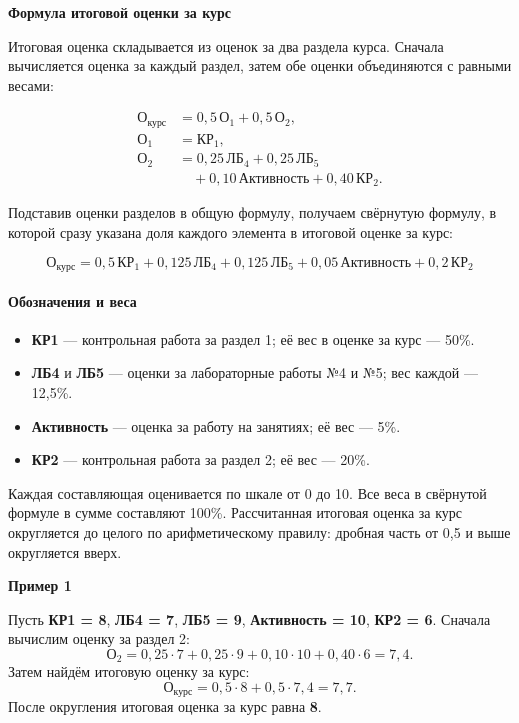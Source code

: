 \documentclass[a4paper,12pt]{extarticle}
\begin{document}
\thispagestyle{empty}
\begin{center}
{\Large\textbf{Формула итоговой оценки за курс}}
\end{center}

Итоговая оценка складывается из оценок за два раздела курса. Сначала
вычисляется оценка за каждый раздел, затем обе оценки объединяются с равными
весами:

\[
\begin{aligned}
    \text{О}_{\text{курс}} &= 0{,}5\,\text{О}_1 + 0{,}5\,\text{О}_2,\\
    \text{О}_1 &= \text{КР}_1,\\[1em]
    \text{О}_2 &= 0{,}25\,\text{ЛБ}_4 + 0{,}25\,\text{ЛБ}_5\\
        &\quad + 0{,}10\,\text{Активность} + 0{,}40\,\text{КР}_2.
\end{aligned}
\]

Подставив оценки разделов в общую формулу, получаем свёрнутую формулу, в которой
сразу указана доля каждого элемента в итоговой оценке за курс:

\[
\boxed{\text{О}_{\text{курс}} = 0{,}5\,\text{КР}_1
    + 0{,}125\,\text{ЛБ}_4 + 0{,}125\,\text{ЛБ}_5
    + 0{,}05\,\text{Активность} + 0{,}2\,\text{КР}_2}
\]

\paragraph{Обозначения и веса}
\begin{itemize}
    \item \textbf{КР1} --- контрольная работа за раздел 1; её вес в оценке за курс --- 50\%.
    \item \textbf{ЛБ4} и \textbf{ЛБ5} --- оценки за лабораторные работы №4 и №5; вес каждой --- 12{,}5\%.
    \item \textbf{Активность} --- оценка за работу на занятиях; её вес --- 5\%.
    \item \textbf{КР2} --- контрольная работа за раздел 2; её вес --- 20\%.
\end{itemize}

Каждая составляющая оценивается по шкале от 0 до 10. Все веса в свёрнутой
формуле в сумме составляют 100\%. Рассчитанная итоговая оценка за курс
округляется до целого по арифметическому правилу: дробная часть от 0{,}5 и выше
округляется вверх.

\medskip
\noindent\textbf{Пример 1}\par
Пусть \textbf{КР1 = 8}, \textbf{ЛБ4 = 7}, \textbf{ЛБ5 = 9},
\textbf{Активность = 10}, \textbf{КР2 = 6}. Сначала вычислим оценку за раздел 2:
\[
\text{О}_2 = 0{,}25\cdot 7 + 0{,}25\cdot 9 + 0{,}10\cdot 10
    + 0{,}40\cdot 6 = 7{,}4.
\]
Затем найдём итоговую оценку за курс:
\[
\text{О}_{\text{курс}} = 0{,}5\cdot 8 + 0{,}5\cdot 7{,}4
    = 7{,}7.
\]
После округления итоговая оценка за курс равна \textbf{8}.
\end{document}
